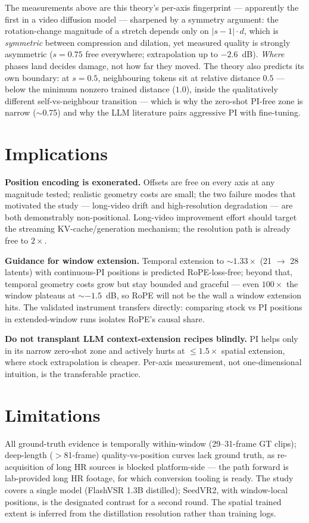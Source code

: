 The measurements above are this theory's per-axis fingerprint --- apparently the
first in a video diffusion model --- sharpened by a symmetry argument: the
rotation-change magnitude of a stretch depends only on $|s - 1| \cdot d$, which
is \emph{symmetric} between compression and dilation, yet measured quality is
strongly asymmetric ($s{=}0.75$ free everywhere; extrapolation up to
$-2.6$~dB). \emph{Where} phases land decides damage, not how far they moved.
The theory also predicts its own boundary: at $s{=}0.5$, neighbouring tokens sit
at relative distance $0.5$ --- below the minimum nonzero trained distance
($1.0$), inside the qualitatively different self-vs-neighbour transition ---
which is why the zero-shot PI-free zone is narrow ($\sim$0.75) and why the LLM
literature pairs aggressive PI with fine-tuning.

\section{Implications}
\label{sec:rope:implications}

\textbf{Position encoding is exonerated.} Offsets are free on every axis at any
magnitude tested; realistic geometry costs are small; the two failure modes that
motivated the study --- long-video drift and high-resolution degradation --- are
both demonstrably non-positional. Long-video improvement effort should target
the streaming KV-cache/generation mechanism; the resolution path is already free
to $2\times$.

\textbf{Guidance for window extension.} Temporal extension to $\sim$$1.33\times$
(21 $\to$ 28 latents) with continuous-PI positions is predicted RoPE-loss-free;
beyond that, temporal geometry costs grow but stay bounded and graceful --- even
$100\times$ the window plateaus at $\sim$$-1.5$~dB, so RoPE will not be the wall
a window extension hits. The validated instrument transfers directly: comparing
stock vs PI positions in extended-window runs isolates RoPE's causal share.

\textbf{Do not transplant LLM context-extension recipes blindly.} PI helps only
in its narrow zero-shot zone and actively hurts at $\leq$$1.5\times$ spatial
extension, where stock extrapolation is cheaper. Per-axis measurement, not
one-dimensional intuition, is the transferable practice.

\section{Limitations}
\label{sec:rope:limitations}

All ground-truth evidence is temporally within-window (29--31-frame GT clips);
deep-length ($>$81-frame) quality-vs-position curves lack ground truth, as
re-acquisition of long HR sources is blocked platform-side --- the path forward
is lab-provided long HR footage, for which conversion tooling is ready. The
study covers a single model (FlashVSR 1.3B distilled); SeedVR2, with
window-local positions, is the designated contrast for a second round. The
spatial trained extent is inferred from the distillation resolution rather than
training logs.
